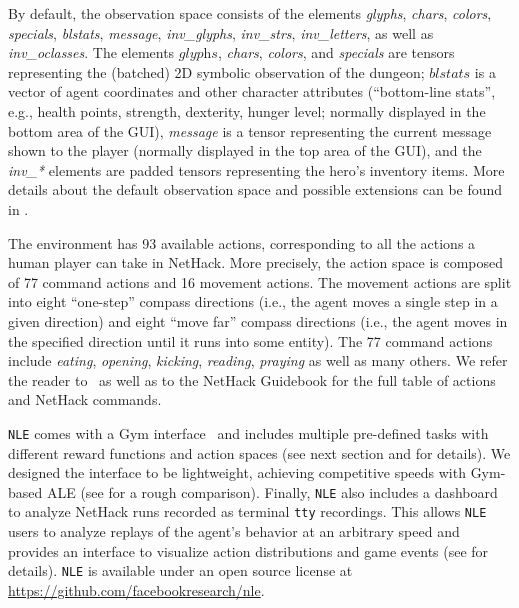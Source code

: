 \documentclass{article}
\newcommand{\nethack}{NetHack}
\newcommand{\NLE}{\texttt{NLE}}
\begin{document}
By default, the observation space consists of the elements
\textit{glyphs}, \textit{chars}, \textit{colors}, \textit{specials},
\textit{blstats}, \textit{message}, \textit{inv\_glyphs}, \textit{inv\_strs},
\textit{inv\_letters}, as well as \textit{inv\_oclasses}.
The elements $\textit{glyphs}$, \textit{chars}, \textit{colors},
and \textit{specials} are tensors representing
the (batched) 2D symbolic observation of the dungeon; $\textit{blstats}$ is a vector
of agent coordinates and other character attributes (``bottom-line
stats'', e.g., health
points, strength, dexterity, hunger level; normally displayed in the
bottom area of the GUI), \textit{message} is a tensor representing
the current message shown to the player (normally displayed in the top
area of the GUI), and the \textit{inv\_*} elements are padded tensors
representing the hero's inventory items. More details about the
default observation space and possible extensions can be found
in .

The environment has 93 available actions, corresponding to all the
actions a human player can take in \nethack{}. More precisely, the
action space is composed of 77 command actions and 16 movement
actions. The movement actions are split into eight ``one-step'' compass
directions (i.e., the agent moves a single step in a given direction)
and eight ``move far'' compass directions (i.e., the agent moves in the
specified direction until it runs into some entity). The 77 command
actions include \emph{eating}, \emph{opening}, \emph{kicking},
\emph{reading}, \emph{praying} as well as many others. We refer the
reader to~ as well as to the NetHack Guidebook \cite{raymond2020guide}
for the full table of actions and NetHack commands.

\NLE{} comes with a Gym
interface~\citep{DBLP:journals/corr/BrockmanCPSSTZ16} and includes
multiple pre-defined tasks with different reward functions and action
spaces (see next section and  for details). We designed the interface to be
lightweight, achieving competitive speeds with Gym-based ALE (see
 for a rough comparison).
Finally, \NLE{} also includes a dashboard to analyze NetHack runs
recorded as terminal \texttt{tty} recordings. This allows \NLE{} users
to analyze replays of the agent's behavior at an arbitrary speed and
provides an interface to visualize action distributions and game
events (see  for details).
\NLE{} is available under an open source license at \url{https://github.com/facebookresearch/nle}.
\end{document}

